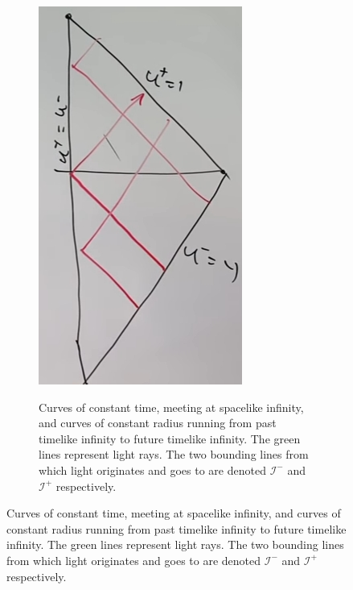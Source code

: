 \documentclass[]{article}
\begin{document}
{\begin{figure}[H]
\begin{center}
\begin{subfigure}[t]{0.3\textwidth}
			\includegraphics[width=\textwidth]{gr-8-uPM}
		\end{subfigure}
		\;
		\begin{subfigure}[t]{0.3\textwidth}
			\caption{Curves of constant time, meeting at spacelike infinity, and curves of constant radius running from past timelike infinity to future timelike infinity. The green lines represent light rays. The two bounding lines from which light originates and goes to are denoted $\mathscr{I}^-$ and $\mathscr{I}^+$ respectively.}\label{fig:gr-8-penrose-constant-time}

\end{subfigure}
\end{center}
\end{figure}}
\end{document}
